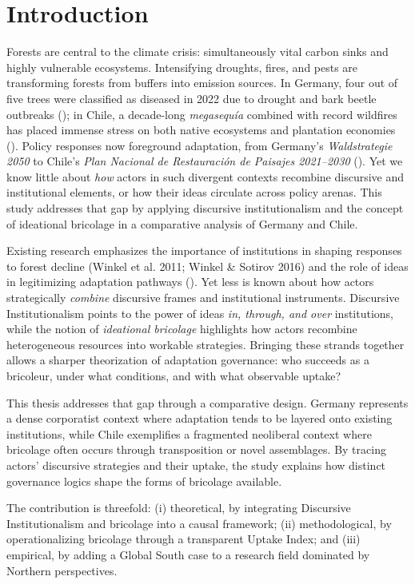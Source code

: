 \section*{Introduction}

Forests are central to the climate crisis: simultaneously vital carbon sinks and
highly vulnerable ecosystems. Intensifying droughts, fires, and pests are
transforming forests from buffers into emission sources. In Germany, four out of
five trees were classified as diseased in 2022 due to drought and bark beetle
outbreaks (\cite{BMEL2023}); in Chile, a decade-long \emph{megasequía} combined
with record wildfires has placed immense stress on both native ecosystems and
plantation economies (\cite{FAO2022}). Policy responses now foreground
adaptation, from Germany’s \emph{Waldstrategie 2050} to Chile’s \emph{Plan
Nacional de Restauración de Paisajes 2021–2030} (\cite{MMA2021}). Yet we know
little about \emph{how} actors in such divergent contexts recombine discursive
and institutional elements, or how their ideas circulate across policy arenas.
This study addresses that gap by applying discursive institutionalism and the
concept of ideational bricolage in a comparative analysis of Germany and Chile.

Existing research emphasizes the importance of institutions in shaping responses 
to forest decline (Winkel et al. 2011; Winkel \& Sotirov 2016) and the role of ideas 
in legitimizing adaptation pathways (\cite{Schmidt2008}). Yet less is known about how 
actors strategically \emph{combine} discursive frames and institutional instruments. 
Discursive Institutionalism points to the power of ideas \emph{in, through, and over} 
institutions, while the notion of \emph{ideational bricolage} highlights how actors 
recombine heterogeneous resources into workable strategies. Bringing these strands 
together allows a sharper theorization of adaptation governance: who succeeds as a 
bricoleur, under what conditions, and with what observable uptake?

This thesis addresses that gap through a comparative design. Germany represents a 
dense corporatist context where adaptation tends to be layered onto existing 
institutions, while Chile exemplifies a fragmented neoliberal context where bricolage 
often occurs through transposition or novel assemblages. By tracing actors’ discursive 
strategies and their uptake, the study explains how distinct governance logics shape 
the forms of bricolage available.


The contribution is threefold: (i) theoretical, by integrating Discursive 
Institutionalism and bricolage into a causal framework; (ii) methodological, by 
operationalizing bricolage through a transparent Uptake Index; and (iii) empirical, 
by adding a Global South case to a research field dominated by Northern perspectives.
